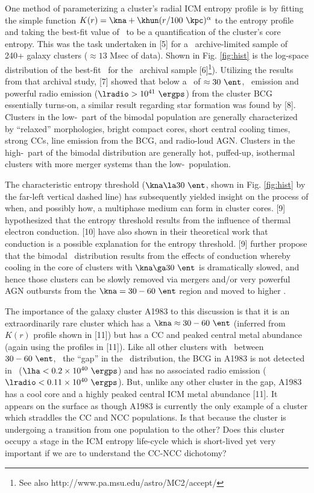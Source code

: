 \documentclass[letterpaper,11pt,twocolumn]{article}
\begin{document}
One method of parameterizing a cluster's radial ICM entropy profile is
by fitting the simple function $K(r) = \kna + \khun
(r/100~\kpc)^{\alpha}$ to the entropy profile and taking the best-fit
value of \kna\ to be a quantification of the cluster's core
entropy. This was the task undertaken in [5] for a
\chandra\ archive-limited sample of 240+ galaxy clusters ($\approx 13$
Msec of data). Shown in Fig. \ref{fig:hist} is the log-space
distribution of the best-fit \kna\ for the \chandra\ archival sample
[6]\footnote{See also
  http://www.pa.msu.edu/astro/MC2/accept/}). Utilizing the results
from that archival study, [7] showed that below a \kna\ of $\approx
30~\ent$, \halpha\ emission and powerful radio emission ($\lradio >
10^{41}~\ergps$) from the cluster BCG essentially turns-on, a similar
result regarding star formation was found by [8]. Clusters in the
low-\kna\ part of the bimodal population are generally characterized
by ``relaxed'' morphologies, bright compact cores, short central
cooling times, strong CCs, line emission from the BCG, and radio-loud
AGN. Clusters in the high-\kna\ part of the bimodal distribution are
generally hot, puffed-up, isothermal clusters with more merger systems
than the low-\kna\ population.

The characteristic entropy threshold ($\kna \la 30~\ent$, shown in
Fig. \ref{fig:hist} by the far-left vertical dashed line) has
subsequently yielded insight on the process of when, and possibly how,
a multiphase medium can form in cluster cores. [9] hypothesized that
the entropy threshold results from the influence of thermal electron
conduction. [10] have also shown in their theoretical work that
conduction is a possible explanation for the entropy threshold. [9]
further propose that the bimodal \kna\ distribution results from the
effects of conduction whereby cooling in the core of clusters with
$\kna \ga 30~\ent$ is dramatically slowed, and hence those clusters
can be slowly removed via mergers and/or very powerful AGN outbursts
from the $\kna=30-60~\ent$ region and moved to higher \kna.

The importance of the galaxy cluster A1983 to this discussion is that
it is an extraordinarily rare cluster which has a $\kna \approx
30-60~\ent$ (inferred from $K(r)$ profile shown in [11]) but has a CC
and peaked central metal abundance (again using the profiles in
[11]). Like all other clusters with \kna\ between $30-60~\ent$,
\eg\ the ``gap'' in the \kna\ distribution, the BCG in A1983 is not
detected in \halpha\ ($\lha < 0.2\times10^{40}~\ergps$) and has no
associated radio emission ($\lradio < 0.11\times10^{40}~\ergps$). But,
unlike any other cluster in the gap, A1983 has a cool core and a
highly peaked central ICM metal abundance [11]. It appears on the
surface as though A1983 is currently the only example of a cluster
which straddles the CC and NCC populations. Is that because the
cluster is undergoing a transition from one population to the other?
Does this cluster occupy a stage in the ICM entropy life-cycle which
is short-lived yet very important if we are to understand the CC-NCC
dichotomy?\\
\end{document}
